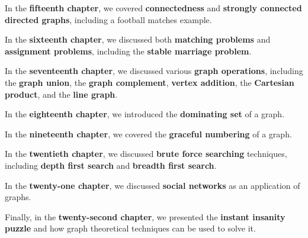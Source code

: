 In the \textbf{fifteenth chapter}, we covered \textbf{connectedness} and \textbf{strongly connected directed graphs}, including a football matches example.

In the \textbf{sixteenth chapter}, we discussed both \textbf{matching problems} and \textbf{assignment problems}, including the \textbf{stable marriage problem}.

In the \textbf{seventeenth chapter}, we discussed various \textbf{graph operations}, including the \textbf{graph union}, the \textbf{graph complement}, \textbf{vertex addition}, the \textbf{Cartesian product}, and the \textbf{line graph}.

In the \textbf{eighteenth chapter}, we introduced the \textbf{dominating set} of a graph.

In the \textbf{nineteenth chapter}, we covered the \textbf{graceful numbering} of a graph.

In the \textbf{twentieth chapter}, we discussed \textbf{brute force searching} techniques, including \textbf{depth first search} and \textbf{breadth first search}.

In the \textbf{twenty-one chapter}, we discussed \textbf{social networks} as an application of graphs.

Finally, in the \textbf{twenty-second chapter}, we presented the \textbf{instant insanity puzzle} and how graph theoretical techniques can be used to solve it.
